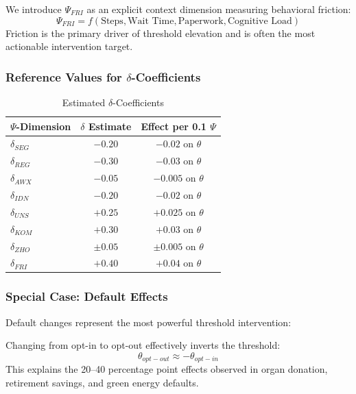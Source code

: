 \begin{definition}
\label{def:friction}
We introduce $\Psi_{FRI}$ as an explicit context dimension measuring behavioral friction:
\begin{equation}
\Psi_{FRI} = f(\text{Steps}, \text{Wait Time}, \text{Paperwork}, \text{Cognitive Load})
\end{equation}
Friction is the primary driver of threshold elevation and is often the most actionable intervention target.
\end{definition}

\subsubsection{Reference Values for $\delta$-Coefficients}

\begin{table}[htbp]
\centering
\caption{Estimated $\delta$-Coefficients}
\label{tab:delta-values}
\begin{tabular}{@{}lcc@{}}
\toprule
\textbf{$\Psi$-Dimension} & \textbf{$\delta$ Estimate} & \textbf{Effect per 0.1 $\Psi$} \\
\midrule
$\delta_{SEG}$ & $-0.20$ & $-0.02$ on $\theta$ \\
$\delta_{REG}$ & $-0.30$ & $-0.03$ on $\theta$ \\
$\delta_{AWX}$ & $-0.05$ & $-0.005$ on $\theta$ \\
$\delta_{IDN}$ & $-0.20$ & $-0.02$ on $\theta$ \\
$\delta_{UNS}$ & $+0.25$ & $+0.025$ on $\theta$ \\
$\delta_{KOM}$ & $+0.30$ & $+0.03$ on $\theta$ \\
$\delta_{ZHO}$ & $\pm 0.05$ & $\pm 0.005$ on $\theta$ \\
$\delta_{FRI}$ & $+0.40$ & $+0.04$ on $\theta$ \\
\bottomrule
\end{tabular}
\end{table}

\subsubsection{Special Case: Default Effects}

Default changes represent the most powerful threshold intervention:

\begin{proposition}
\label{prop:default}
Changing from opt-in to opt-out effectively inverts the threshold:
\begin{equation}
\theta_{opt-out} \approx -\theta_{opt-in}
\end{equation}
This explains the 20--40 percentage point effects observed in organ donation, retirement savings, and green energy defaults.
\end{proposition}

